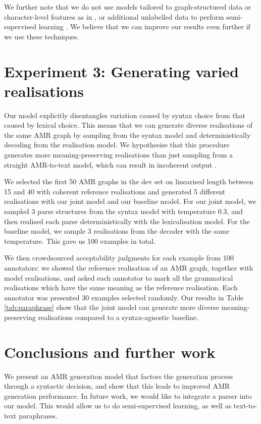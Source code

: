 We further note that we do not use models tailored to graph-structured data or character-level features as in \citet{Song:18,Beck:18}, or additional unlabelled data to perform semi-supervised learning \citep{Konstas:17}. We believe that we can improve our results even further if we use these techniques.

\section{Experiment 3: Generating varied realisations}
Our model explicitly disentangles variation caused by syntax choice from that caused by lexical choice. This means that we can generate diverse realisations of the same AMR graph by sampling from the syntax model and deterministically decoding from the realisation model. We hypothesise that this procedure generates more meaning-preserving realisations than just sampling from a straight AMR-to-text model, which can result in incoherent output \citep{Cao:17}.

We selected the first 50 AMR graphs in the dev set on linearised length between 15 and 40 with coherent reference realisations and generated 5 different realisations with our joint model and our baseline model. For our joint model, we sampled 3 parse structures from the syntax model with temperature 0.3, and then realised each parse deterministically with the lexicalisation model. For the baseline model, we sample 3 realisations from the decoder with the same temperature. This gave us 100 examples in total.

We then crowdsourced acceptability judgments for each example from 100 annotators: we showed the reference realisation of an AMR graph, together with model realisations, and asked each annotator to mark all the grammatical realisations which have the same meaning as the reference realisation. Each annotator was presented 30 examples selected randomly. Our results in Table \ref{tab:paraphrase} show that the joint model can generate more diverse meaning-preserving realisations compared to a syntax-agnostic baseline. 

\section{Conclusions and further work}

We present an AMR generation model that factors the generation process through a syntactic decision, and show that this leads to improved AMR generation performance. In future work, we would like to integrate a parser into our model. This would allow us to do semi-supervised learning, as well as text-to-text paraphrases.